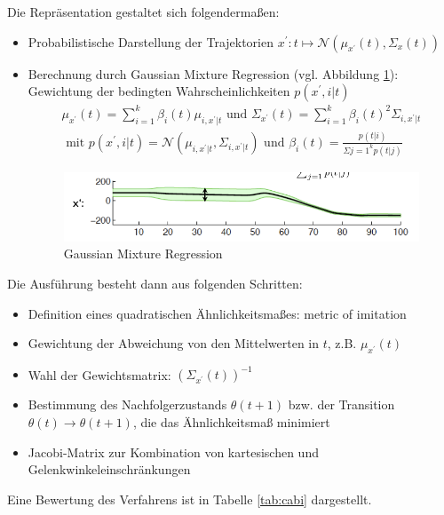 Die Repräsentation gestaltet sich folgendermaßen:
\begin{itemize}
\item Probabilistische Darstellung der Trajektorien $x^\prime: t \mapsto \mathcal{N}(\mu_{x^\prime}(t), \Sigma_x(t))$
\item Berechnung durch Gaussian Mixture Regression (vgl. Abbildung \ref{fig:ch03_gmr}): Gewichtung der bedingten Wahrscheinlichkeiten $p(x^\prime, i|t)$
\begin{align*}
\mu_{x^\prime}(t) = \sum\limits_{i=1}^k \beta_i(t)\mu_{i, x^\prime|t} \text{ und } \Sigma_{x^\prime}(t) = \sum\limits_{i=1}^k \beta_i(t)^2\Sigma_{i, x^\prime|t}\\
\text{ mit } p(x^\prime,i|t) = \mathcal{N}(\mu_{i, x^\prime|t}, \Sigma_{i, x^\prime|t}) \text{ und } \beta_i(t) = \frac{p(t|i)}{\Sigma{j=1}^k p(t|j)}
\end{align*}
\begin{figure}[ht]\centering 
\includegraphics[width=0.6\linewidth]{figures/ch03_gmr.png}
\caption{Gaussian Mixture Regression}
\label{fig:ch03_gmr}
\end{figure}
\end{itemize}
Die Ausführung besteht dann aus folgenden Schritten:
\begin{itemize}
\item Definition eines quadratischen Ähnlichkeitsmaßes: \Gu metric of imitation\Go
\item Gewichtung der Abweichung von den Mittelwerten in $t$, z.B. $\mu_{x^\prime}(t)$
\item Wahl der Gewichtsmatrix: $(\Sigma_{x^\prime}(t))^{-1}$
\item Bestimmung des Nachfolgerzustands $\theta(t+1)$ bzw. der Transition $\theta(t) \rightarrow \theta(t+1)$, die
das Ähnlichkeitsmaß minimiert
\item Jacobi-Matrix zur Kombination von kartesischen und Gelenkwinkeleinschränkungen
\end{itemize}
Eine Bewertung des Verfahrens ist in Tabelle \ref{tab:cabi} dargestellt.
